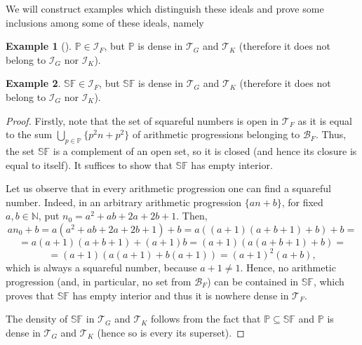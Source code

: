 \documentclass{amsart}
\theoremstyle{definition}
\theoremstyle{definition}
\newtheorem{ex}{Example}
\newcommand{\N}{{\mathbb N}}
\newcommand{\I}{\mathcal I}
\newcommand{\T}{\mathcal{T}}
\newcommand{\B}{\mathcal{B}}
\newcommand{\SqrFr}{\mathbb{SF}}
\begin{document}
We will construct examples which 
distinguish these ideals and prove some
inclusions among some of these ideals, namely



\begin{ex}[\cite{Szczuka4}] 
$\mathbb{P}\in \I_F$, but $\mathbb{P}$ is dense in $\T_G$ and $\T_K$ (therefore it does not belong to $\I_G$ nor $\I_K$).
\end{ex}

\begin{ex} 
$\SqrFr\in \I_F$, but $\SqrFr$ is dense in $\T_G$ and $\T_K$ (therefore it does not belong to $\I_G$ nor $\I_K$).
\end{ex}

\begin{proof}
Firstly, note that the set of squareful numbers is open in $\T_F$ as it is equal to the sum $\bigcup_{p\in\mathbb{P}} \{p^2 n+p^2\}$ of arithmetic progressions belonging to $\B_F$. Thus, the set $\SqrFr$ is a complement of an open set, so it is closed (and hence its closure is equal to itself). It suffices to show that $\SqrFr$ has empty interior.

Let us observe that in every arithmetic progression one can find a squareful number. Indeed, in an arbitrary arithmetic progression $\{an+b\}$, for fixed $a,b\in\N$, put $n_0 = a^2 +ab+2a+2b+1$. Then,
$$an_0 +b = a(a^2 +ab+2a+2b+1)+b = a((a+1)(a+b+1)+b)+b = $$
$$= a(a+1)(a+b+1)+(a+1)b = (a+1)(a(a+b+1)+b) =$$
$$= (a+1)(a(a+1)+b(a+1))= (a+1)^2 (a+b),$$
which is always a squareful number, because $a+1  \neq 1$. Hence, no arithmetic progression (and, in particular, no set from $\B_F$) can be contained in $\SqrFr$, which proves that $\SqrFr$ has empty interior and thus it is nowhere dense in $\T_F$.

The density of $\SqrFr$ in $\T_G$ and $\T_K$ follows from the fact that $\mathbb{P}\subseteq \SqrFr$ and $\mathbb{P}$ is dense in $\T_G$ and $\T_K$ (hence so is every its superset).
\end{proof}
\end{document}
